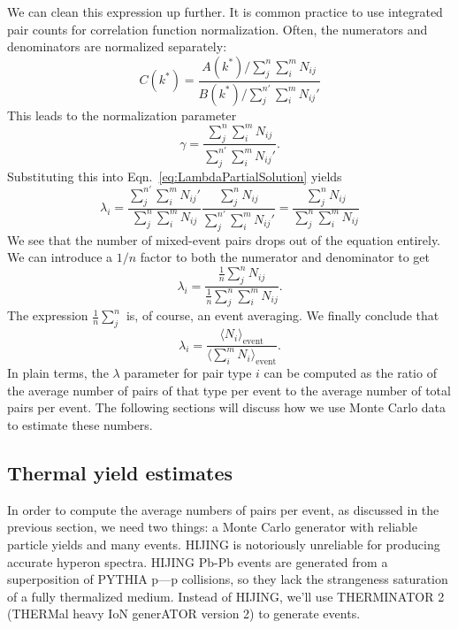 We can clean this expression up further.  It is common practice to use integrated pair counts for correlation function normalization. Often, the numerators and denominators are normalized separately:
\begin{equation}
C(k^*) = \frac{A(k^*)/\sum_j^n \sum_i^m N_{ij}}{B(k^*)/\sum_j^{n'} \sum_i^m N_{ij}'}
\end{equation}
This leads to the normalization parameter
\begin{equation}
\gamma = \frac{\sum_j^n \sum_i^m N_{ij}}{\sum_j^{n'} \sum_i^m N_{ij}'}.
\end{equation}
Substituting this into Eqn.\ \ref{eq:LambdaPartialSolution} yields 
\begin{equation}
\lambda_i = \frac{\sum_j^{n'} \sum_i^m N_{ij}'} {\sum_j^n \sum_i^m N_{ij}} \frac{\sum_j^n N_{ij} }{\sum_j^{n'} \sum_i^m N_{ij}'} = \frac{\sum_j^n N_{ij} }{\sum_j^n \sum_i^m N_{ij}}
\end{equation}
We see that the number of mixed-event pairs drops out of the equation entirely. We can introduce a $1/n$ factor to both the numerator and denominator to get
\begin{equation}
\lambda_i = \frac{\frac{1}{n}\sum_j^n N_{ij} }{\frac{1}{n}\sum_j^n \sum_i^m N_{ij}}.
\end{equation}
The expression $\frac{1}{n} \sum_j^n$ is, of course, an event averaging. We finally conclude that
\begin{equation}
\label{eq:LambdaParSolution}
\lambda_i = \frac{\langle N_{i}\rangle_{\mathrm{event}}} {\langle\sum_i^m N_{i}\rangle_{\mathrm{event}}}.
\end{equation}
In plain terms, the $\lambda$ parameter for pair type $i$ can be computed as the ratio of the average number of pairs of that type per event to the average number of total pairs per event. 
The following sections will discuss how we use Monte Carlo data to estimate these numbers.

\subsection{Thermal yield estimates}
\label{sec:ThermalYields}


In order to compute the average numbers of pairs per event, as discussed in the previous section, we need two things: a Monte Carlo generator with reliable particle yields and many events. 
HIJING is notoriously unreliable for producing accurate hyperon spectra.  
HIJING Pb-Pb events are generated from a superposition of PYTHIA p---p collisions, so they lack the strangeness saturation of a fully thermalized medium.  
Instead of HIJING, we'll use THERMINATOR 2 (THERMal heavy IoN generATOR version 2)  \cite{Chojnacki:2011hb} to generate events.

